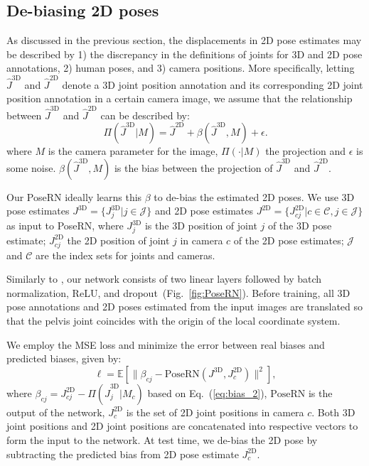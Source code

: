 \documentclass{article}
\newcommand{\figref}[1]{{Fig.~\ref{fig:#1}}}
\begin{document}
\subsection{De-biasing 2D poses}
\label{sec:debias}
\vspace{-0.1cm}

As discussed in the previous section, the displacements in 2D pose estimates may be described by 1) the discrepancy in the definitions of joints for 3D and 2D pose annotations, 2) human poses, and 3) camera positions. More specifically, letting $\hat{J}^\text{3D}$ and $\hat{J}^\text{2D}$ denote a 3D joint position annotation and its corresponding 2D joint position annotation in a certain camera image, we assume that the relationship between $\hat{J}^\text{3D}$ and $\hat{J}^\text{2D}$ can be described by:
\begin{equation}
    \Pi(\hat{J}^\text{3D}|M) = \hat{J}^\text{2D} + \beta(\hat{J}^\text{3D}, M) + \epsilon. \label{eq:bias_2}
\end{equation}
where $M$ is the camera parameter for the image, $\Pi(\cdot|M)$ the projection and $\epsilon$ is some noise.
$\beta(\hat{J}^\text{3D}, M)$ is the bias between the projection of $\hat{J}^\text{3D}$ and $\hat{J}^\text{2D}$.

Our PoseRN ideally learns this $\beta$ to de-bias the estimated 2D poses. 
We use 3D pose estimates $J^\text{3D} = \{J_j^\text{3D}|j \in \mathcal{J}\}$ and 2D pose estimates $J^\text{2D} = \{J_{cj}^\text{2D}|c \in \mathcal{C}, j \in \mathcal{J}\}$ as input to PoseRN, where $J_j^\text{3D}$ is the 3D position of joint $j$ of the 3D pose estimate; $J_{cj}^\text{2D}$ the 2D position of joint $j$ in camera $c$ of the 2D pose estimates; $\mathcal{J}$ and $\mathcal{C}$ are the index sets for joints and cameras.

Similarly to \cite{Martinez_2017_ICCV}, our network consists of two linear layers followed by batch normalization, ReLU, and dropout~(\figref{PoseRN}).
Before training, all 3D pose annotations and 2D poses estimated from the input images are translated so that the pelvis joint coincides with the origin of the local coordinate system. 

We employ the MSE loss and minimize the error between real biases and predicted biases, given by:
\begin{equation}
    \ell = \mathbb{E}[\|\beta_{cj} - \text{PoseRN}(J^\text{3D}, J^\text{2D}_{c})\|^2],
\end{equation}
where $\beta_{cj} = J^\text{2D}_{cj} - \Pi(\hat{J}^\text{3D}_j|M_c)$ based on Eq.~(\ref{eq:bias_2}), $\text{PoseRN}$ is the output of the network, $J^\text{2D}_{c}$ is the set of 2D joint positions in camera $c$.
Both 3D joint positions and 2D joint positions are concatenated into respective vectors to form the input to the network. At test time, we de-bias the 2D pose by subtracting the predicted bias from 2D pose estimate $J^\text{2D}_{c}$. 
\end{document}

